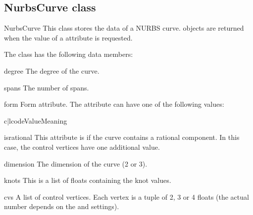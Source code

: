 \subsection{NurbsCurve class}
\label{nurbscurve}

\begin{classdesc*}{NurbsCurve}
This class stores the data of a NURBS curve.  objects
are returned when the value of a  attribute is requested.
\end{classdesc*}

The class has the following data members:

\begin{memberdesc}{degree}
The degree of the curve.
\end{memberdesc}

\begin{memberdesc}{spans}
The number of spans.
\end{memberdesc}

\begin{memberdesc}{form}
Form attribute. The attribute can have one of the following values:

\begin{tableii}{c|l}{code}{Value}{Meaning}
\end{tableii}
\end{memberdesc}

\begin{memberdesc}{isrational}
This attribute is  if the curve contains a rational component.
In this case, the control vertices have one additional value.
\end{memberdesc}

\begin{memberdesc}{dimension}
The dimension of the curve (2 or 3).
\end{memberdesc}

\begin{memberdesc}{knots}
This is a list of floats containing the knot values.
\end{memberdesc}

\begin{memberdesc}{cvs}
A list of control vertices. Each vertex is a tuple of 2, 3 or 4 floats
(the actual number depends on the  and 
settings).
\end{memberdesc}
